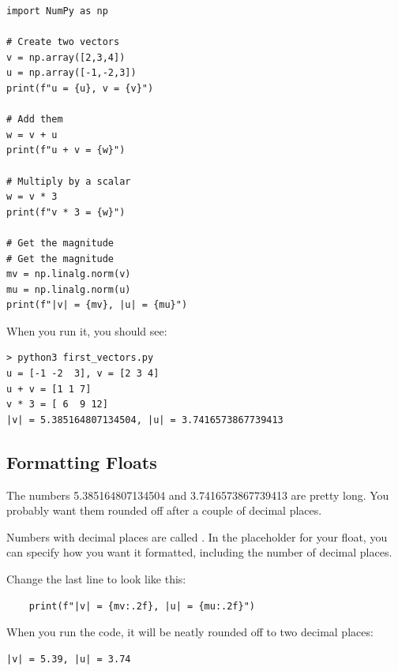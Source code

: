 \begin{Verbatim}
import NumPy as np

# Create two vectors
v = np.array([2,3,4])
u = np.array([-1,-2,3])
print(f"u = {u}, v = {v}")

# Add them
w = v + u
print(f"u + v = {w}")

# Multiply by a scalar
w = v * 3
print(f"v * 3 = {w}")

# Get the magnitude
# Get the magnitude
mv = np.linalg.norm(v)
mu = np.linalg.norm(u)
print(f"|v| = {mv}, |u| = {mu}")
\end{Verbatim}

When you run it, you should see:

\begin{Verbatim}
> python3 first_vectors.py
u = [-1 -2  3], v = [2 3 4]
u + v = [1 1 7]
v * 3 = [ 6  9 12]
|v| = 5.385164807134504, |u| = 3.7416573867739413
\end{Verbatim}

\subsection{Formatting Floats}

The numbers 5.385164807134504 and 3.7416573867739413 are pretty long. You 
probably want them rounded off after a couple of decimal places.

Numbers with decimal places are called . In the placeholder 
for your float, you can specify how you want it formatted, including the 
number of decimal places.

Change the last line to look like this:
\begin{Verbatim}
    print(f"|v| = {mv:.2f}, |u| = {mu:.2f}")
\end{Verbatim}

When you run the code, it will be neatly rounded off to two decimal places:
\begin{Verbatim}
|v| = 5.39, |u| = 3.74
\end{Verbatim}
